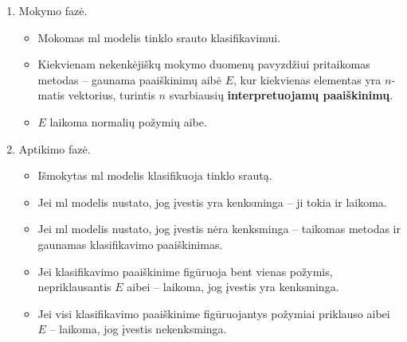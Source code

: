 \noindent
\begin{minipage}[l]{0.45\textwidth}
    \begin{enumerate}[leftmargin=*]
        \item Mokymo fazė.
        \begin{itemize}[leftmargin=*]
            \item Mokomas \gls{ml} modelis tinklo srauto klasifikavimui.
            \item Kiekvienam nekenkėjiškų mokymo duomenų pavyzdžiui pritaikomas \LIME metodas -- gaunama paaiškinimų aibė $E$, kur kiekvienas elementas yra $n$-matis vektorius, turintis $n$ svarbiausių \textbf{interpretuojamų paaiškinimų}.
            \item $E$ laikoma normalių požymių aibe.
        \end{itemize}
        \item Aptikimo fazė.
        \begin{itemize}[leftmargin=*]
            \item Išmokytas \gls{ml} modelis klasifikuoja tinklo srautą.
            \item Jei \gls{ml} modelis nustato, jog įvestis yra kenksminga -- ji tokia ir laikoma.
            \item Jei \gls{ml} modelis nustato, jog įvestis nėra kenksminga -- taikomas \LIME metodas ir gaunamas klasifikavimo paaiškinimas.
            \item Jei klasifikavimo paaiškinime figūruoja bent vienas požymis, nepriklausantis $E$ aibei -- laikoma, jog įvestis yra kenksminga.
            \item Jei visi klasifikavimo paaiškinime figūruojantys požymiai priklauso aibei $E$ -- laikoma, jog įvestis nekenksminga.
        \end{itemize}
    \end{enumerate}
\end{minipage}
\hspace{0.02\textwidth}
